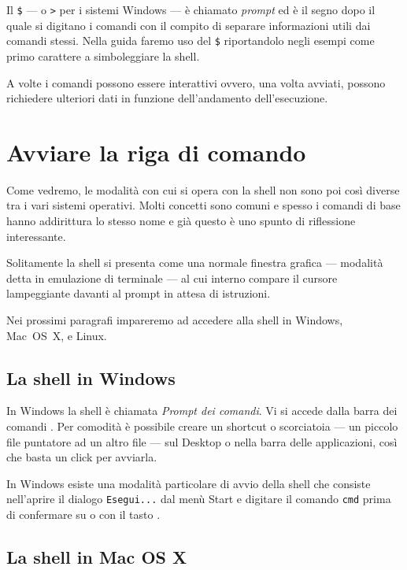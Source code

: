 Il \texttt{\$} --- o \texttt{>} per i sistemi Windows --- è chiamato
\emph{prompt} ed è il segno dopo il quale si digitano i comandi con il compito
di separare informazioni utili dai comandi stessi. Nella guida faremo uso del
\texttt{\$} riportandolo negli esempi come primo carattere a simboleggiare la
shell.

A volte i comandi possono essere interattivi ovvero, una volta avviati, possono
richiedere ulteriori dati in funzione dell'andamento dell'esecuzione.

\section{Avviare la riga di comando}\label{secAvvio}

Come vedremo, le modalità con cui si opera con la shell non sono poi così
diverse tra i vari sistemi operativi. Molti concetti sono comuni e spesso i
comandi di base hanno addirittura lo stesso nome e già questo è uno spunto di
riflessione interessante.

Solitamente la shell si presenta come una normale finestra grafica --- modalità
detta in emulazione di terminale --- al cui interno compare il cursore
lampeggiante davanti al prompt in attesa di istruzioni.

Nei prossimi paragrafi impareremo ad accedere alla shell in Windows, Mac~OS~X, e
Linux.

\subsection{La shell in Windows}

In Windows la shell è chiamata \emph{Prompt dei comandi}. Vi si accede dalla
barra dei comandi .
Per comodità è possibile creare un shortcut o scorciatoia --- un piccolo file
puntatore ad un altro file --- sul Desktop o nella barra delle applicazioni,
così che basta un click per avviarla.

In Windows esiste una modalità particolare di avvio della shell che consiste
nell'aprire il dialogo \texttt{Esegui...} dal menù Start e digitare il comando
\texttt{cmd} prima di confermare su  o con il tasto \keys{\return}.

\subsection{La shell in Mac OS X}

